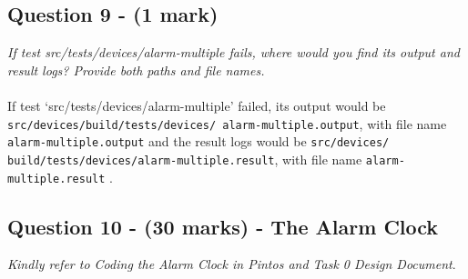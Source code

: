 \documentclass{article}
\begin{document}
\subsection*{Question 9 - (1 mark)}
\textit{If test src/tests/devices/alarm-multiple fails, where would you find its output and result logs? Provide both paths and file names.}
\\ \\
If test `src/tests/devices/alarm-multiple' failed, its output would be \texttt{src/devices/build/tests/devices/
alarm-multiple.output}, with file name \texttt{alarm-multiple.output} and the result logs would be \texttt{src/devices/
build/tests/devices/alarm-multiple.result}, with file name \texttt{alarm-multiple.result} .

\subsection*{Question 10 - (30 marks) - The Alarm Clock}

\textit{ Kindly refer to Coding the Alarm Clock in Pintos and Task 0 Design Document}.
\end{document}
